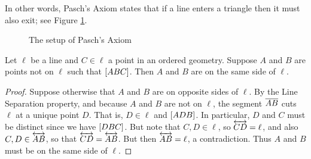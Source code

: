 In other words, Pasch's Axiom states that if a line enters a triangle then it must also exit; see Figure \ref{fig:pasch}.

\begin{figure}[h]
\begin{center}
\caption{\label{fig:pasch}The setup of Pasch's Axiom}
\end{center}
\end{figure}

\begin{lem}
Let \(\ell\) be a line and \(C \in \ell\) a point in an ordered geometry.
Suppose \(A\) and \(B\) are points not on \(\ell\) such that \([ A B C ]\).
Then \(A\) and \(B\) are on the same side of \(\ell\).
\end{lem}

\begin{proof}
Suppose otherwise that \(A\) and \(B\) are on opposite sides of \(\ell\).
By the Line Separation property, and because \(A\) and \(B\) are not on \(\ell\), the segment \(\overline{AB}\) cuts \(\ell\) at a unique point \(D\).
That is, \(D \in \ell\) and \([ A D B ]\).
In particular, \(D\) and \(C\) must be distinct since we have \([ D B C ]\).
But note that \(C, D \in \ell\), so \(\overleftrightarrow{CD} = \ell\), and also \(C, D \in \overleftrightarrow{AB}\), so that \(\overleftrightarrow{CD} = \overleftrightarrow{AB}\).
But then \(\overleftrightarrow{AB} = \ell\), a contradiction.
Thus \(A\) and \(B\) must be on the same side of \(\ell\).
\end{proof}

\Exercises%
